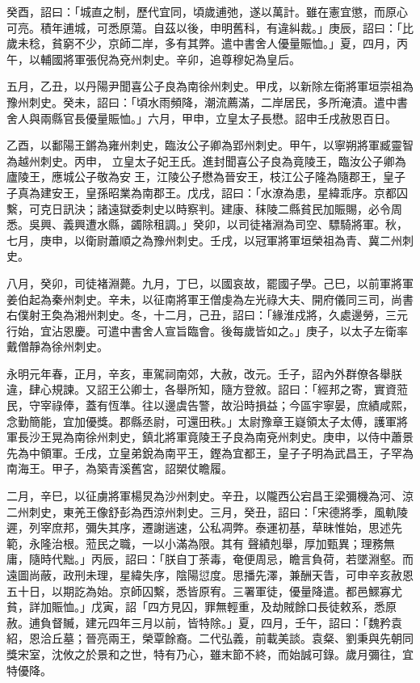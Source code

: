 \begin{pinyinscope}
 癸酉，詔曰：「城直之制，歷代宜同，頃歲逋弛，遂以萬計。雖在憲宜懲，而原心可亮。積年逋城，可悉原蕩。自茲以後，申明舊科，有違糾裁。」庚辰，詔曰：「比歲未稔，貧窮不少，京師二岸，多有其弊。遣中書舍人優量賑恤。」夏，四月，丙午，以輔國將軍張倪為兗州刺史。辛卯，追尊穆妃為皇后。



 五月，乙丑，以丹陽尹聞喜公子良為南徐州刺史。甲戌，以新除左衛將軍垣崇祖為豫州刺史。癸未，詔曰：「頃水雨頻降，潮流薦滿，二岸居民，多所淹漬。遣中書舍人與兩縣官長優量賑恤。」六月，甲申，立皇太子長懋。詔申壬戌赦恩百日。



 乙酉，以鄱陽王鏘為雍州刺史，臨汝公子卿為郢州刺史。甲午，以寧朔將軍臧靈智為越州刺史。丙申，
 立皇太子妃王氏。進封聞喜公子良為竟陵王，臨汝公子卿為廬陵王，應城公子敬為安王，江陵公子懋為晉安王，枝江公子隆為隨郡王，皇子子真為建安王，皇孫昭業為南郡王。戊戌，詔曰：「水潦為患，星緯乖序。京都囚繫，可克日訊決；諸遠獄委刺史以時察判。建康、秣陵二縣貧民加賑賜，必令周悉。吳興、義興遭水縣，蠲除租調。」癸卯，以司徒褚淵為司空、驃騎將軍。秋，七月，庚申，以衛尉蕭順之為豫州刺史。壬戌，以冠軍將軍垣榮祖為青、冀二州刺史。



 八月，癸卯，司徒褚淵薨。九月，丁巳，以國哀故，罷國子學。己巳，以前軍將軍姜伯起為秦州刺史。辛未，以征南將軍王僧虔為左光祿大夫、開府儀同三司，尚書右僕射王奐為湘州刺史。冬，十二月，己丑，詔曰：「緣淮戍將，久處邊勞，三元行始，宜沾恩慶。可遣中書舍人宣旨臨會。後每歲皆如之。」庚子，以太子左衛率戴僧靜為徐州刺史。



 永明元年春，正月，辛亥，車駕祠南郊，大赦，改元。壬子，詔內外群僚各舉朕違，肆心規諫。又詔王公卿士，各舉所知，隨方登敘。詔曰：「經邦之寄，實資蒞民，守宰祿俸，蓋有恆準。往以邊虞告警，故沿時損益；今區宇寧晏，庶績咸熙，念勤簡能，宜加優獎。郡縣丞尉，可還田秩。」太尉豫章王嶷領太子太傅，護軍將軍長沙王晃為南徐州刺史，鎮北將軍竟陵王子良為南兗州刺史。庚申，以侍中蕭景先為中領軍。壬戌，立皇弟銳為南平王，鏗為宜都王，皇子子明為武昌王，子罕為南海王。甲子，為築青溪舊宮，詔槊仗瞻履。



 二月，辛巳，以征虜將軍楊炅為沙州刺史。辛丑，以隴西公宕昌王梁彌機為河、涼二州刺史，東羌王像舒彭為西涼州刺史。三月，癸丑，詔曰：「宋德將季，風軌陵遲，列宰庶邦，彌失其序，遷謝遄速，公私凋弊。泰運初基，草昧惟始，思述先範，永隆治根。蒞民之職，一以小滿為限。其有
 聲績剋舉，厚加甄異；理務無庸，隨時代黜。」丙辰，詔曰：「朕自丁荼毒，奄便周忌，瞻言負荷，若墜淵壑。而遠圖尚蔽，政刑未理，星緯失序，陰陽愆度。思播先澤，兼酬天眚，可申辛亥赦恩五十日，以期訖為始。京師囚繫，悉皆原宥。三署軍徒，優量降遣。都邑鰥寡尤貧，詳加賑恤。」戊寅，詔「四方見囚，罪無輕重，及劫賊餘口長徒敕系，悉原赦。逋負督贓，建元四年三月以前，皆特除。」夏，四月，壬午，詔曰：「魏矜袁紹，恩洽丘墓；晉亮兩王，榮覃餘裔。二代弘義，前載美談。袁粲、劉秉與先朝同獎宋室，沈攸之於景和之世，特有乃心，雖末節不終，而始誠可錄。歲月彌往，宜特優降。




\end{pinyinscope}
